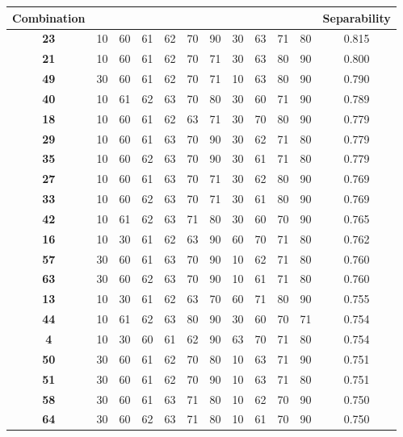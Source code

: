 \begin{table}
\centering
\begin{tabular}{|c|c|c|c|c|c|c|c|c|c|c|c|}

\hline
Combination &  &  &  &  &  &  &  &  &  &  & Separability \\
\hline
\textbf{23} & 10 & 60 & 61 & 62 & 70 & 90 & 30 & 63 & 71 & 80 & 0.815 \\
\hline
\textbf{21} & 10 & 60 & 61 & 62 & 70 & 71 & 30 & 63 & 80 & 90 & 0.800 \\
\hline
\textbf{49} & 30 & 60 & 61 & 62 & 70 & 71 & 10 & 63 & 80 & 90 & 0.790 \\
\hline
\textbf{40} & 10 & 61 & 62 & 63 & 70 & 80 & 30 & 60 & 71 & 90 & 0.789 \\
\hline
\textbf{18} & 10 & 60 & 61 & 62 & 63 & 71 & 30 & 70 & 80 & 90 & 0.779 \\
\hline
\textbf{29} & 10 & 60 & 61 & 63 & 70 & 90 & 30 & 62 & 71 & 80 & 0.779 \\
\hline
\textbf{35} & 10 & 60 & 62 & 63 & 70 & 90 & 30 & 61 & 71 & 80 & 0.779 \\
\hline
\textbf{27} & 10 & 60 & 61 & 63 & 70 & 71 & 30 & 62 & 80 & 90 & 0.769 \\
\hline
\textbf{33} & 10 & 60 & 62 & 63 & 70 & 71 & 30 & 61 & 80 & 90 & 0.769 \\
\hline
\textbf{42} & 10 & 61 & 62 & 63 & 71 & 80 & 30 & 60 & 70 & 90 & 0.765 \\
\hline
\textbf{16} & 10 & 30 & 61 & 62 & 63 & 90 & 60 & 70 & 71 & 80 & 0.762 \\
\hline
\textbf{57} & 30 & 60 & 61 & 63 & 70 & 90 & 10 & 62 & 71 & 80 & 0.760 \\
\hline
\textbf{63} & 30 & 60 & 62 & 63 & 70 & 90 & 10 & 61 & 71 & 80 & 0.760 \\
\hline
\textbf{13} & 10 & 30 & 61 & 62 & 63 & 70 & 60 & 71 & 80 & 90 & 0.755 \\
\hline
\textbf{44} & 10 & 61 & 62 & 63 & 80 & 90 & 30 & 60 & 70 & 71 & 0.754 \\
\hline
\textbf{4} & 10 & 30 & 60 & 61 & 62 & 90 & 63 & 70 & 71 & 80 & 0.754 \\
\hline
\textbf{50} & 30 & 60 & 61 & 62 & 70 & 80 & 10 & 63 & 71 & 90 & 0.751 \\
\hline
\textbf{51} & 30 & 60 & 61 & 62 & 70 & 90 & 10 & 63 & 71 & 80 & 0.751 \\
\hline
\textbf{58} & 30 & 60 & 61 & 63 & 71 & 80 & 10 & 62 & 70 & 90 & 0.750 \\
\hline
\textbf{64} & 30 & 60 & 62 & 63 & 71 & 80 & 10 & 61 & 70 & 90 & 0.750 \\

\end{tabular}
\end{table}
